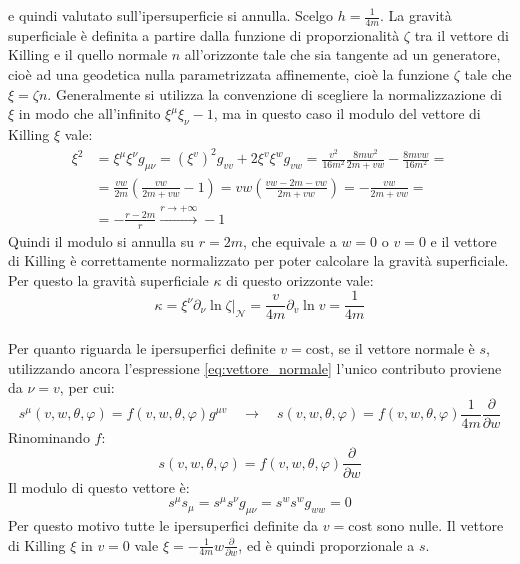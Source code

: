 \documentclass[]{scrartcl}
\newcommand{\pd}{\partial}
\newcommand{\pfrac}[1]{\frac{\partial}{\partial #1}}
\newcommand{\cost}{\mathrm{cost}}
\begin{document}
e quindi valutato sull'ipersuperficie si annulla. Scelgo $ h = \frac{1}{4m} $.
La gravità superficiale è definita a partire dalla funzione di proporzionalità $ \zeta $ tra il vettore di Killing e il
quello normale $ n $ all'orizzonte tale che sia tangente ad un generatore, cioè ad una geodetica nulla parametrizzata affinemente,
cioè la funzione $ \zeta $ tale che $ \xi = \zeta n $. Generalmente si utilizza la convenzione di scegliere la normalizzazione
di $ \xi $ in modo che all'infinito $ \xi^\mu\xi_\nu - 1 $, ma in questo caso il modulo del vettore di Killing $ \xi $ vale:
\begin{align*}
  \xi^2 & = \xi^\mu\xi^\nu g_{\mu\nu} = (\xi^v)^2g_{vv} + 2\xi^v\xi^wg_{vw} = \frac{v^2}{16 m^2}\frac{8mw^2}{2m + vw} - \frac{8m vw}{16m^2} = \\
        & = \frac{vw}{2m} \left( \frac{vw}{2m + vw} - 1 \right) = vw \left( \frac{vw - 2m - vw}{2m + vw}  \right) = - \frac{vw}{2m + vw} = \\
        & = - \frac{r - 2m}{r} \overset{r \to + \infty}{\rightarrow} -1
\end{align*}
Quindi il modulo si annulla su $ r = 2m $, che equivale a $ w = 0 $ o $ v = 0 $ e il vettore di Killing è
correttamente normalizzato per poter calcolare la gravità superficiale.
Per questo la gravità superficiale $ \kappa $ di questo orizzonte vale:
\[
  \kappa = \xi^\nu \pd_\nu \ln \zeta \rvert_\mathcal{N} = \frac{v}{4m}\partial_v \ln v = \frac{1}{4m}
\] \\
Per quanto riguarda le ipersuperfici definite $ v = \cost $, se il vettore normale è $ s $,
utilizzando ancora l'espressione \eqref{eq:vettore_normale} l'unico contributo proviene da $ \nu = v $, per cui:
\[
  s^\mu(v,w,\theta,\varphi) = f(v,w,\theta,\varphi) g^{\mu v} %
  \quad  \rightarrow \quad
  s(v,w,\theta,\varphi) = f(v,w,\theta,\varphi) \frac{1}{4m} \pfrac{w}
\]
Rinominando $ f $:
\[
  s(v,w,\theta,\varphi) = f(v,w,\theta,\varphi) \pfrac{w}
\]
Il modulo di questo vettore è:
\[
  s^{\mu}s_{\mu} = s^{\mu}s^{\nu}g_{\mu\nu} = s^w s^w g_{ww} = 0
\]
Per questo motivo tutte le ipersuperfici definite da $ v = \cost $ sono nulle. Il vettore di Killing $ \xi $ in $ v = 0 $
vale $ \xi = -\frac{1}{4m} w \pfrac{w} $, ed è quindi proporzionale a $ s $.
\end{document}
